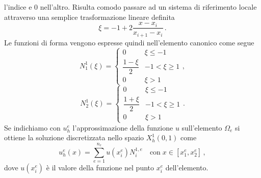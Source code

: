l'indice e $0$ nell'altro. 
Risulta comodo passare ad un sistema di riferimento locale attraverso una 
semplice trasformazione lineare definita
\begin{equation}
 \xi=-1+2\frac{x-x_{i}}{x_{i+1}-x_{i}} \,.
\end{equation}
Le funzioni di forma vengono espresse quindi nell'elemento canonico come segue
\begin{equation}
 N^{1}_{1}(\xi)=
 \begin{cases}
  0 & \xi \leq -1 \\
  \dfrac{1-\xi}{2} & -1 < \xi \geq 1 \\
  0 & \xi > 1 
 \end{cases}
,
\end{equation}
\begin{equation}
 N^{1}_{2}(\xi)=
 \begin{cases}
  0 & \xi \leq -1 \\
  \dfrac{1+\xi}{2} & -1 < \xi \geq 1 \\
  0 & \xi > 1 
 \end{cases}
.
\end{equation}
Se indichiamo con $u_{h}^{e}$ l'approssimazione della
funzione $u$ sull'elemento $\Omega_{e}$ si ottiene la soluzione
discretizzata nello spazio $X^1_h(0,1)$  come
\begin{equation}
 u_{h}^{e}(x)=\sum_{e=1}^{n_{e}}u(x_{i}^{e})N_{i}^{1,e} \quad \text{con} \; x \in [x_{1}^{e},x_{2}^{e}] \, ,
\end{equation}
dove $u(x_{i}^{e})$ è il valore della funzione nel punto $x_{i}^{e}$ dell'elemento. 

